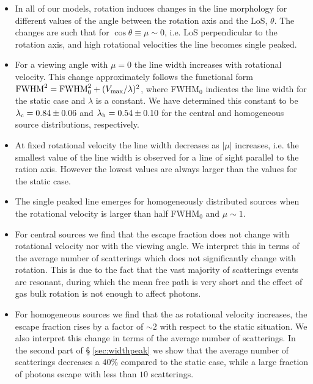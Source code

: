 \documentclass{emulateapj}
\newcommand{\ly}{{\ifmmode{{\rm Ly}\alpha~}\else{Ly$\alpha$~}\fi}}
\begin{document}
\begin{itemize}

\item In all of our models, rotation induces changes in the line morphology
 for different values of the angle between the rotation
 axis and the LoS, $\theta$.  The changes are such that for 
 $\cos\theta\equiv \mu\sim 0$, i.e. LoS perpendicular to the
 rotation axis, and high rotational velocities the line becomes single peaked.


\item For a viewing angle with $\mu=0$ the line width increases with rotational
  velocity. This change approximately follows the functional form  ${\rm FWHM}^2 = {\rm FWHM}_{ 0}^2 + (V_{\rm max}/\lambda)^2$, where FWHM$_{0}$ indicates the line
  width for the static case and $\lambda$ is a constant. We have
  determined this constant to be  $\lambda_{\rm c}=0.84 \pm 0.06$ and
  $\lambda_{\rm h}=0.54\pm 0.10$ for the central and homogeneous source
  distributions, respectively.

\item At fixed rotational velocity the line width decreases as $|\mu|$
  increases, i.e. the smallest value of the line width is observed for
  a line of sight parallel to the ration axis. However the lowest
  values are always larger than the values for the static case. 

\item The single peaked line emerges for homogeneously distributed sources 
  when the rotational velocity is larger than half FWHM$_0$ and $\mu\sim
  1$.

\item  For central sources we find that the escape fraction does not change
  with rotational velocity nor with the viewing angle. We interpret this
  in terms of the average number of scatterings which does not
  significantly change with rotation. This is due to the  
  fact that the vast majority of scatterings events are resonant, 
  during which the mean free path is very short and the effect of gas
  bulk rotation is not enough to affect \ly photons. 
  
\item For homogeneous sources we find that the  as rotational velocity
  increases, the escape fraction rises by a factor of $\sim 2$ with
  respect to the static situation. We also interpret this change in
  terms of the average number of scatterings. In the second part of \S
  \ref{sec:widthpeak} we show that the average number of scatterings
  decreases a $40\%$ compared to the static case, while a large
  fraction of photons escape with less than $10$ scatterings.  


\end{itemize}
\end{document}
